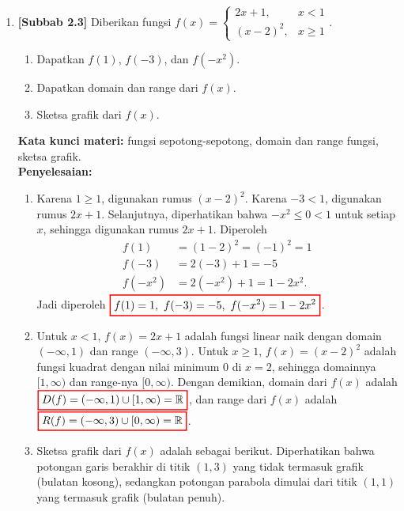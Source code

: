 \documentclass[10pt,openany,a4paper]{article}
\theoremstyle{definition}
\theoremstyle{definition}
\theoremstyle{plain}
\newenvironment{jawab}[2][tes]{%
\par\noindent\textbf{Kata kunci materi:} #1.\\
\textbf{Penyelesaian:} #2%
}{}
\begin{document}
\begin{enumerate}
    \item \textbf{[Subbab 2.3]} Diberikan fungsi $f(x)=\begin{cases}
        2x+1, & x<1\\
        (x-2)^2, & x\geq 1
    \end{cases}$.
    \begin{enumerate}
        \item Dapatkan $f(1)$, $f(-3)$, dan $f(-x^2)$.
        \item Dapatkan domain dan range dari $f(x)$.
        \item Sketsa grafik dari $f(x)$.
    \end{enumerate}
    \begin{jawab}[fungsi sepotong-sepotong, domain dan range fungsi, sketsa grafik]{
        \begin{enumerate}
            \item Karena $1\geq 1$, digunakan rumus $(x-2)^2$. Karena $-3<1$, digunakan rumus $2x+1$. Selanjutnya, diperhatikan bahwa $-x^2\leq 0 < 1$ untuk setiap $x$, sehingga digunakan rumus $2x+1$. Diperoleh
            \begin{align*}
                f(1) &= (1-2)^2 = (-1)^2 = 1\\
                f(-3) &= 2(-3)+1 = -5\\
                f(-x^2) &= 2(-x^2)+1 = 1-2x^2.
            \end{align*}
            Jadi diperoleh $\colorlet{oldcolor}{.}
        \color{red}
        \setlength{\fboxrule}{1pt} \boxed{\color{oldcolor}f(1)=1,~f(-3)=-5,~f(-x^2)=1-2x^2}\color{oldcolor}$.
            \item Untuk $x<1$, $f(x)=2x+1$ adalah fungsi linear naik dengan domain $(-\infty,1)$ dan range $(-\infty,3)$. Untuk $x\geq 1$, $f(x)=(x-2)^2$ adalah fungsi kuadrat dengan nilai minimum $0$ di $x=2$, sehingga domainnya $[1,\infty)$ dan range-nya $[0,\infty)$. Dengan demikian, domain dari $f(x)$ adalah $\colorlet{oldcolor}{.}
        \color{red}
        \setlength{\fboxrule}{1pt} \boxed{\color{oldcolor}D(f)=(-\infty,1)\cup[1,\infty) = \mathbb{R}}\color{oldcolor}$, dan range dari $f(x)$ adalah $\colorlet{oldcolor}{.}
        \color{red}
        \setlength{\fboxrule}{1pt} \boxed{\color{oldcolor}R(f)=(-\infty,3)\cup[0,\infty) = \mathbb{R}}\color{oldcolor}$.
            \item Sketsa grafik dari $f(x)$ adalah sebagai berikut. Diperhatikan bahwa potongan garis berakhir di titik $(1,3)$ yang tidak termasuk grafik (bulatan kosong), sedangkan potongan parabola dimulai dari titik $(1,1)$ yang termasuk grafik (bulatan penuh).

\end{enumerate}}
\end{jawab}
\end{enumerate}
\end{document}
